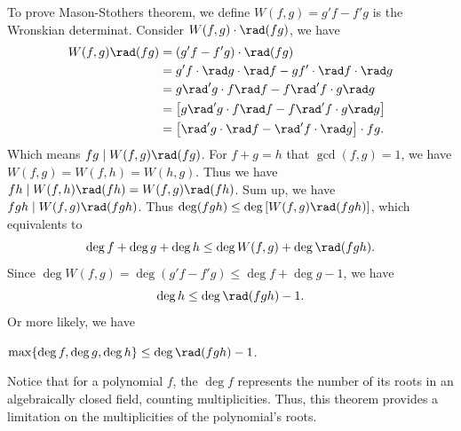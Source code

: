 To prove Mason-Stothers theorem, we define $W(f, g) = g'f - f'g$ is the Wronskian determinat. Consider $W(f, g)\cdot\rad(fg)$, we have 
\begin{align*}
	W(f, g)\rad(fg) &= (g'f - f'g)\cdot\rad(fg)\\
	&= g'f\cdot\rad g\cdot\rad f - gf'\cdot\rad f\cdot\rad g \\
	&= g\rad'g\cdot f\rad f - f\rad'f\cdot g\rad g \\
	&= \left[g\rad'g\cdot f\rad f - f\rad'f\cdot g\rad g\right] \\
	&= \left[\rad'g\cdot \rad f - \rad'f\cdot \rad g\right]\cdot fg.
\end{align*}
Which means $fg \mid W(f, g)\rad(fg)$.
For $f + g = h$ that $\gcd(f, g) = 1$, we have $W(f, g) = W(f, h) = W(h, g)$. Thus we have $fh \mid W(f, h)\rad(fh) = W(f, g)\rad(fh)$.
Sum up, we have $fgh \mid W(f, g)\rad(fgh)$. Thus $\deg(fgh) \le \deg\left[W(f, g)\rad(fgh)\right]$, which equivalents to
\[ \deg f + \deg g + \deg h \le \deg W(f, g) + \deg \rad(fgh). \]
Since $\deg W(f, g) = \deg (g'f - f'g) \le \deg f + \deg g - 1$, we have
\[ \deg h \le \deg \rad(fgh) - 1. \]
Or more likely, we have
\begin{theorem}
	$\max\{ \deg f, \deg g, \deg h \} \le \deg \rad(fgh) - 1$.
\end{theorem}
Notice that for a polynomial $f$, the $\deg f$ represents the number of its roots in an algebraically closed field, counting multiplicities. Thus, this theorem provides a limitation on the multiplicities of the polynomial's roots.

